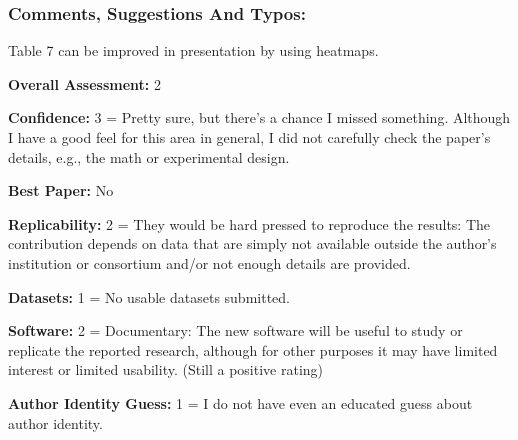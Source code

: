 \documentclass[12pt,times,a4paper,twoside]{article}
\theoremstyle{definition}
\begin{document}
\subsubsection*{Comments, Suggestions And Typos:}

Table 7 can be improved in presentation by using heatmaps.

\textbf{Overall Assessment:} 2

\textbf{Confidence:} 3 =  Pretty sure, but there's a chance I missed something. Although I have a good feel for this area in general, I did not carefully check the paper's details, e.g., the math or experimental design.

\textbf{Best Paper:} No

\textbf{Replicability:} 2 = They would be hard pressed to reproduce the results: The contribution depends on data that are simply not available outside the author's institution or consortium and/or not enough details are provided.

\textbf{Datasets:} 1 = No usable datasets submitted.

\textbf{Software:} 2 = Documentary: The new software will be useful to study or replicate the reported research, although for other purposes it may have limited interest or limited usability. (Still a positive rating)

\textbf{Author Identity Guess:} 1 = I do not have even an educated guess about author identity.
\end{document}
